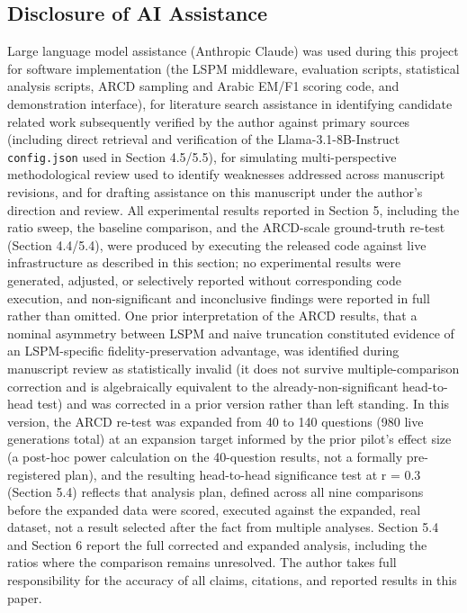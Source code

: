 \subsection{Disclosure of AI Assistance}
Large language model assistance (Anthropic Claude) was used during this project for software implementation (the LSPM middleware, evaluation scripts, statistical analysis scripts, ARCD sampling and Arabic EM/F1 scoring code, and demonstration interface), for literature search assistance in identifying candidate related work subsequently verified by the author against primary sources (including direct retrieval and verification of the Llama-3.1-8B-Instruct \texttt{config.json} used in Section 4.5/5.5), for simulating multi-perspective methodological review used to identify weaknesses addressed across manuscript revisions, and for drafting assistance on this manuscript under the author's direction and review. All experimental results reported in Section 5, including the ratio sweep, the baseline comparison, and the ARCD-scale ground-truth re-test (Section 4.4/5.4), were produced by executing the released code against live infrastructure as described in this section; no experimental results were generated, adjusted, or selectively reported without corresponding code execution, and non-significant and inconclusive findings were reported in full rather than omitted. One prior interpretation of the ARCD results, that a nominal asymmetry between LSPM and naive truncation constituted evidence of an LSPM-specific fidelity-preservation advantage, was identified during manuscript review as statistically invalid (it does not survive multiple-comparison correction and is algebraically equivalent to the already-non-significant head-to-head test) and was corrected in a prior version rather than left standing. In this version, the ARCD re-test was expanded from 40 to 140 questions (980 live generations total) at an expansion target informed by the prior pilot's effect size (a post-hoc power calculation on the 40-question results, not a formally pre-registered plan), and the resulting head-to-head significance test at r = 0.3 (Section 5.4) reflects that analysis plan, defined across all nine comparisons before the expanded data were scored, executed against the expanded, real dataset, not a result selected after the fact from multiple analyses. Section 5.4 and Section 6 report the full corrected and expanded analysis, including the ratios where the comparison remains unresolved. The author takes full responsibility for the accuracy of all claims, citations, and reported results in this paper.

